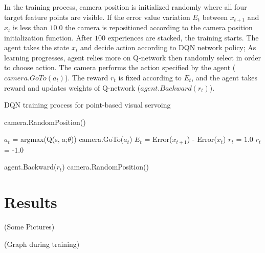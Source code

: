 \documentclass[10pt]{article}
\begin{document}
In the training process, camera position is initialized randomly where all four target feature points are visible. If the error value variation $E_t$ between $x_{t+1}$ and $x_t$ is less than $10.0$ the camera is repositioned according to the camera position initialization function. After $100$ experiences are stacked, the training starts. The agent takes the state $x_t$ and decide action according to DQN network policy; As learning progresses, agent relies more on Q-network then randomly select in order to choose action. The camera performs the action specified by the agent ($camera.GoTo(a_t)$). The reward $r_t$ is fixed according to $E_t$, and the agent takes reward and updates weights of Q-network ($agent.Backward(r_t)$).

 \begin{algorithm}
   \caption{DQN training process for point-based visual servoing}\label{algo1}
   \begin{algorithmic}[1]

     \State camera.RandomPosition()



     \State $a_t$ =  argmax(Q(s, a;$\theta$))
     \State camera.GoTo($a_t$)
     \State $E_t$ = Error($x_{t+1}$) - Error($x_t$)
     \State $r_t$ = $1.0$
     \Else
     \State $r_t$ = -$1.0$
     \EndIf

     agent.Backward($r_t$)
     camera.RandomPosition()
     \EndIf

     \EndFor

   \end{algorithmic}
 \end{algorithm}


\section{Results}
(Some Pictures)

(Graph during training)
\end{document}
